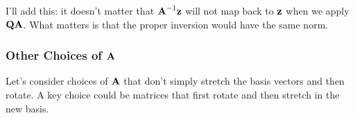 I'll add this: it doesn't matter that ${\bm{\mathrm{A}}}^{-1} \bm{\mathrm{z}}$ will not map
back to $\bm{\mathrm{z}}$ when we apply $\bm{\mathrm{Q}}\bm{\mathrm{A}}$. What matters is that the
proper inversion would have the same norm.

\subsubsection{Other Choices of $\bm{\mathrm{A}}$}

Let's consider choices of $\bm{\mathrm{A}}$ that don't simply stretch the basis
vectors and then rotate. A key choice could be matrices that first
rotate and then stretch in the new basis.
